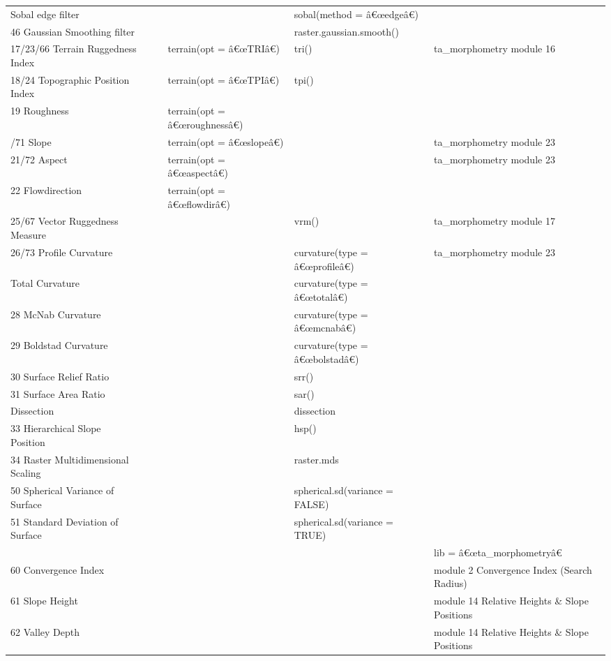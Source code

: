 \documentclass[
]{article}
\begin{document}
\begin{longtable}[t]{llllll}
\addlinespace
49 Sobal edge filter &  &  &  & sobal(method = â€œedgeâ€) & \\
46 Gaussian Smoothing filter &  &  &  & raster.gaussian.smooth() & \\
17/23/66 Terrain Ruggedness Index &  &  & terrain(opt = â€œTRIâ€) & tri() & ta\_morphometry module 16\\
18/24 Topographic Position Index &  &  & terrain(opt = â€œTPIâ€) & tpi() & \\
19 Roughness &  &  & terrain(opt = â€œroughnessâ€) &  & \\
\addlinespace
20/71 Slope &  &  & terrain(opt = â€œslopeâ€) &  & ta\_morphometry module 23\\
21/72 Aspect &  &  & terrain(opt = â€œaspectâ€) &  & ta\_morphometry module 23\\
22 Flowdirection &  &  & terrain(opt = â€œflowdirâ€) &  & \\
25/67 Vector Ruggedness Measure &  &  &  & vrm() & ta\_morphometry module 17\\
26/73 Profile Curvature &  &  &  & curvature(type = â€œprofileâ€) & ta\_morphometry module 23\\
\addlinespace
27 Total Curvature &  &  &  & curvature(type = â€œtotalâ€) & \\
28 McNab Curvature &  &  &  & curvature(type = â€œmcnabâ€) & \\
29 Boldstad Curvature &  &  &  & curvature(type = â€œbolstadâ€) & \\
30 Surface Relief Ratio &  &  &  & srr() & \\
31 Surface Area Ratio &  &  &  & sar() & \\
\addlinespace
32 Dissection &  &  &  & dissection & \\
33 Hierarchical Slope Position &  &  &  & hsp() & \\
34 Raster Multidimensional Scaling &  &  &  & raster.mds & \\
50 Spherical Variance of Surface &  &  &  & spherical.sd(variance = FALSE) & \\
51 Standard Deviation of Surface &  &  &  & spherical.sd(variance = TRUE) & \\
\addlinespace
 &  &  &  &  & lib = â€œta\_morphometryâ€\\
60 Convergence Index &  &  &  &  & module 2 Convergence Index (Search Radius)\\
61 Slope Height &  &  &  &  & module 14 Relative Heights \& Slope Positions\\
62 Valley Depth &  &  &  &  & module 14 Relative Heights \& Slope Positions\\

\end{longtable}
\end{document}
